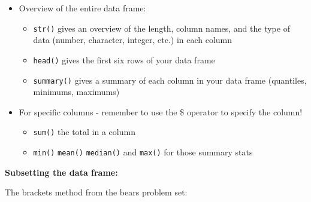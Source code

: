 \documentclass[
]{article}
\newenvironment{Shaded}{\begin{snugshade}}{\end{snugshade}}
\newcommand{\CommentTok}[1]{\textcolor[rgb]{0.56,0.35,0.01}{\textit{#1}}}
\newcommand{\DecValTok}[1]{\textcolor[rgb]{0.00,0.00,0.81}{#1}}
\newcommand{\NormalTok}[1]{#1}
\newcommand{\OtherTok}[1]{\textcolor[rgb]{0.56,0.35,0.01}{#1}}
\newcommand{\SpecialCharTok}[1]{\textcolor[rgb]{0.81,0.36,0.00}{\textbf{#1}}}
\providecommand{\tightlist}{%
  \setlength{\itemsep}{0pt}\setlength{\parskip}{0pt}}
\begin{document}
\begin{itemize}
\tightlist
\item
  Overview of the entire data frame:

  \begin{itemize}
  \tightlist
  \item
    \texttt{str()} gives an overview of the length, column names, and
    the type of data (number, character, integer, etc.) in each column\\
  \item
    \texttt{head()} gives the first six rows of your data frame\\
  \item
    \texttt{summary()} gives a summary of each column in your data frame
    (quantiles, minimums, maximums)\\
  \end{itemize}
\item
  For specific columns - remember to use the \$ operator to specify the
  column!

  \begin{itemize}
  \tightlist
  \item
    \texttt{sum()} the total in a column\\
  \item
    \texttt{min()} \texttt{mean()} \texttt{median()} and \texttt{max()}
    for those summary stats
  \end{itemize}
\end{itemize}

\textbf{Subsetting the data frame:}

The brackets method from the bears problem set:

\begin{Shaded}
\end{Shaded}
\end{document}
